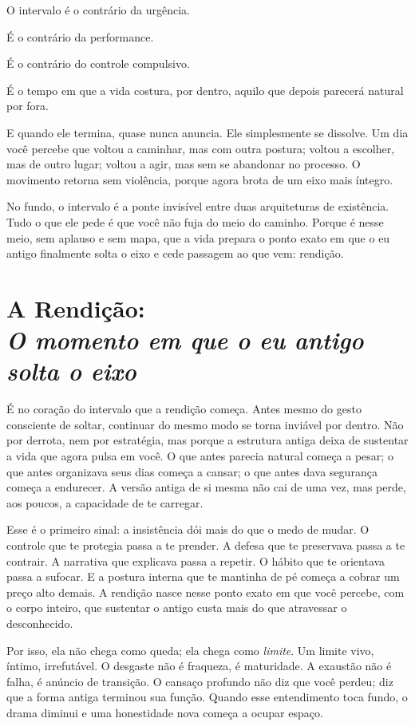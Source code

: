 \documentclass[12pt]{book}
\begin{document}
O intervalo é o contrário da urgência.

É o contrário da performance.

É o contrário do controle compulsivo.

É o tempo em que a vida costura, por dentro, aquilo que depois parecerá natural por fora.

E quando ele termina, quase nunca anuncia. Ele simplesmente se dissolve. Um dia você percebe que voltou a caminhar, mas com outra postura; voltou a escolher, mas de outro lugar; voltou a agir, mas sem se abandonar no processo. O movimento retorna sem violência, porque agora brota de um eixo mais íntegro.

No fundo, o intervalo é a ponte invisível entre duas arquiteturas de existência. Tudo o que ele pede é que você não fuja do meio do caminho. Porque é nesse meio, sem aplauso e sem mapa, que a vida prepara o ponto exato em que o eu antigo finalmente solta o eixo e cede passagem ao que vem: rendição.

\chapter[A Rendição: O momento em que o eu antigo solta o eixo]{A Rendição:\\[0.4ex]\large\itshape O momento em que o eu antigo solta o eixo}

É no coração do intervalo que a rendição começa. Antes mesmo do gesto consciente de soltar, continuar do mesmo modo se torna inviável por dentro. Não por derrota, nem por estratégia, mas porque a estrutura antiga deixa de sustentar a vida que agora pulsa em você. O que antes parecia natural começa a pesar; o que antes organizava seus dias começa a cansar; o que antes dava segurança começa a endurecer. A versão antiga de si mesma não cai de uma vez, mas perde, aos poucos, a capacidade de te carregar.

Esse é o primeiro sinal: a insistência dói mais do que o medo de mudar. O controle que te protegia passa a te prender. A defesa que te preservava passa a te contrair. A narrativa que explicava passa a repetir. O hábito que te orientava passa a sufocar. E a postura interna que te mantinha de pé começa a cobrar um preço alto demais. A rendição nasce nesse ponto exato em que você percebe, com o corpo inteiro, que sustentar o antigo custa mais do que atravessar o desconhecido.

Por isso, ela não chega como queda; ela chega como \textit{limite}. Um limite vivo, íntimo, irrefutável. O desgaste não é fraqueza, é maturidade. A exaustão não é falha, é anúncio de transição. O cansaço profundo não diz que você perdeu; diz que a forma antiga terminou sua função. Quando esse entendimento toca fundo, o drama diminui e uma honestidade nova começa a ocupar espaço.
\end{document}
